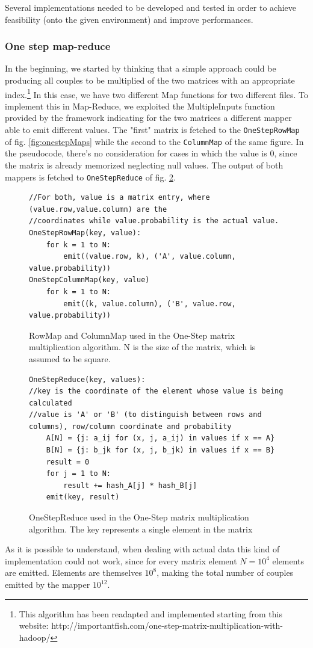Several implementations needed to be developed and tested in order to
achieve feasibility (onto the given environment) and improve performances.

\subsubsection{One step map-reduce}
In the beginning, we started by thinking that a simple approach could be producing all
couples to be multiplied of the two matrices with an appropriate index.\footnote{This algorithm
has been readapted and implemented starting from this website: http://importantfish.com/one-step-matrix-multiplication-with-hadoop/}
In this case, we have two different Map functions for two different files. To implement this in Map-Reduce, we exploited
the MultipleInputs function provided by the framework indicating for the two matrices a different mapper able
to emit different values.
The "first" matrix is fetched to the \texttt{OneStepRowMap} of fig. \ref{fig:onestepMaps} while the second to the \texttt{ColumnMap} of the same figure. In the pseudocode, there's no consideration for cases in which the value is 0, since the
matrix is already memorized neglecting null values.
The output of both mappers is fetched to \texttt{OneStepReduce} of fig. \ref{fig:onestepReduce}.
\begin{figure}[H]
\begin{verbatim}
//For both, value is a matrix entry, where (value.row,value.column) are the
//coordinates while value.probability is the actual value.
OneStepRowMap(key, value):
    for k = 1 to N:
        emit((value.row, k), ('A', value.column, value.probability))
OneStepColumnMap(key, value)
    for k = 1 to N:
        emit((k, value.column), ('B', value.row, value.probability))
\end{verbatim}
\caption{RowMap and ColumnMap used in the One-Step matrix multiplication algorithm. N is the size of the matrix, which is assumed to be square.}
\label{fig:onestep}
\end{figure}

\begin{figure}[H]
\begin{verbatim}
OneStepReduce(key, values):
//key is the coordinate of the element whose value is being calculated
//value is 'A' or 'B' (to distinguish between rows and columns), row/column coordinate and probability
    A[N] = {j: a_ij for (x, j, a_ij) in values if x == A}
    B[N] = {j: b_jk for (x, j, b_jk) in values if x == B}
    result = 0
    for j = 1 to N:
        result += hash_A[j] * hash_B[j]
    emit(key, result)
\end{verbatim}
\caption{OneStepReduce used in the One-Step matrix multiplication algorithm. The key represents a single element in the matrix}
\label{fig:onestepReduce}
\end{figure}
As it is possible to understand, when dealing with actual data this kind of implementation could not
work, since for every matrix element $N=10^4$ elements are emitted. 
Elements are themselves $10^8$, making the total number of couples emitted by the mapper $10^{12}$.

